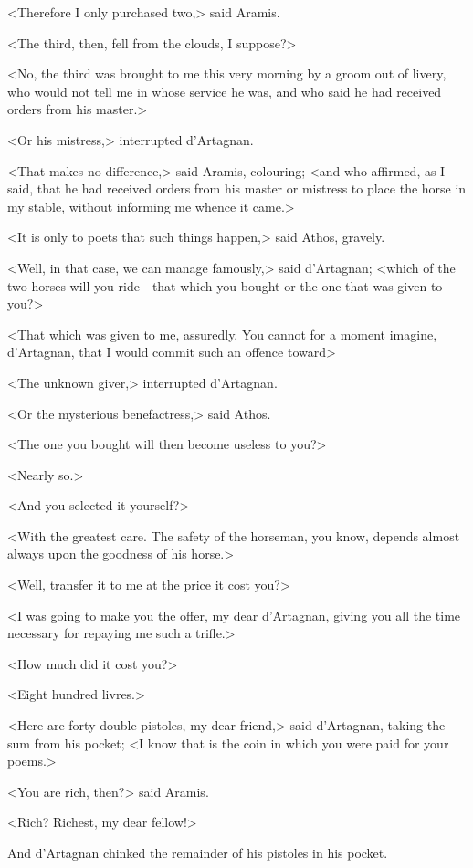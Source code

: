 <Therefore I only purchased two,> said Aramis. 

<The third, then, fell from the clouds, I suppose?> 

<No, the third was brought to me this very morning by a groom out of livery, who would not tell me in whose service he was, and who said he had received orders from his master.> 

<Or his mistress,> interrupted d'Artagnan. 

<That makes no difference,> said Aramis, colouring; <and who affirmed, as I said, that he had received orders from his master or mistress to place the horse in my stable, without informing me whence it came.> 

<It is only to poets that such things happen,> said Athos, gravely. 

<Well, in that case, we can manage famously,> said d'Artagnan; <which of the two horses will you ride---that which you bought or the one that was given to you?> 

<That which was given to me, assuredly. You cannot for a moment imagine, d'Artagnan, that I would commit such an offence toward\longdash> 

<The unknown giver,> interrupted d'Artagnan. 

<Or the mysterious benefactress,> said Athos. 

<The one you bought will then become useless to you?> 

<Nearly so.> 

<And you selected it yourself?> 

<With the greatest care. The safety of the horseman, you know, depends almost always upon the goodness of his horse.> 

<Well, transfer it to me at the price it cost you?> 

<I was going to make you the offer, my dear d'Artagnan, giving you all the time necessary for repaying me such a trifle.> 

<How much did it cost you?> 

<Eight hundred livres.> 

<Here are forty double pistoles, my dear friend,> said d'Artagnan, taking the sum from his pocket; <I know that is the coin in which you were paid for your poems.> 

<You are rich, then?> said Aramis. 

<Rich? Richest, my dear fellow!> 

And d'Artagnan chinked the remainder of his pistoles in his pocket. 

